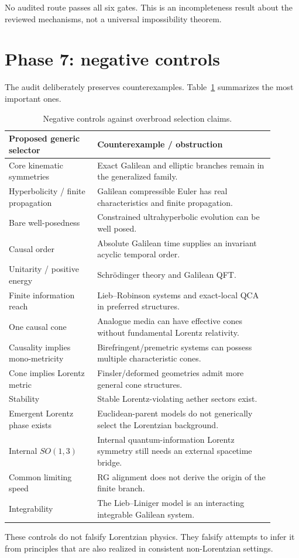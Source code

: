 \documentclass[11pt,a4paper]{article}
\begin{document}
No audited route passes all six gates.  This is an incompleteness result about the reviewed mechanisms, not a universal impossibility theorem.

\section{Phase 7: negative controls}
The audit deliberately preserves counterexamples.  Table~\ref{tab:negative} summarizes the most important ones.
\begin{table}[ht]
\centering
\caption{Negative controls against overbroad selection claims.}
\label{tab:negative}
\renewcommand{\arraystretch}{1.14}
\begin{tabular}{>{\raggedright\arraybackslash}p{0.30\linewidth}>{\raggedright\arraybackslash}p{0.60\linewidth}}
\toprule
Proposed generic selector & Counterexample / obstruction \\
\midrule
Core kinematic symmetries & Exact Galilean and elliptic branches remain in the generalized family. \\
Hyperbolicity / finite propagation & Galilean compressible Euler has real characteristics and finite propagation. \\
Bare well-posedness & Constrained ultrahyperbolic evolution can be well posed. \\
Causal order & Absolute Galilean time supplies an invariant acyclic temporal order. \\
Unitarity / positive energy & Schr\"odinger theory and Galilean QFT. \\
Finite information reach & Lieb--Robinson systems and exact-local QCA in preferred structures. \\
One causal cone & Analogue media can have effective cones without fundamental Lorentz relativity. \\
Causality implies mono-metricity & Birefringent/premetric systems can possess multiple characteristic cones. \\
Cone implies Lorentz metric & Finsler/deformed geometries admit more general cone structures. \\
Stability & Stable Lorentz-violating aether sectors exist. \\
Emergent Lorentz phase exists & Euclidean-parent models do not generically select the Lorentzian background. \\
Internal $SO(1,3)$ & Internal quantum-information Lorentz symmetry still needs an external spacetime bridge. \\
Common limiting speed & RG alignment does not derive the origin of the finite branch. \\
Integrability & The Lieb--Liniger model is an interacting integrable Galilean system. \\
\bottomrule
\end{tabular}
\end{table}
These controls do not falsify Lorentzian physics.  They falsify attempts to infer it from principles that are also realized in consistent non-Lorentzian settings.
\end{document}
